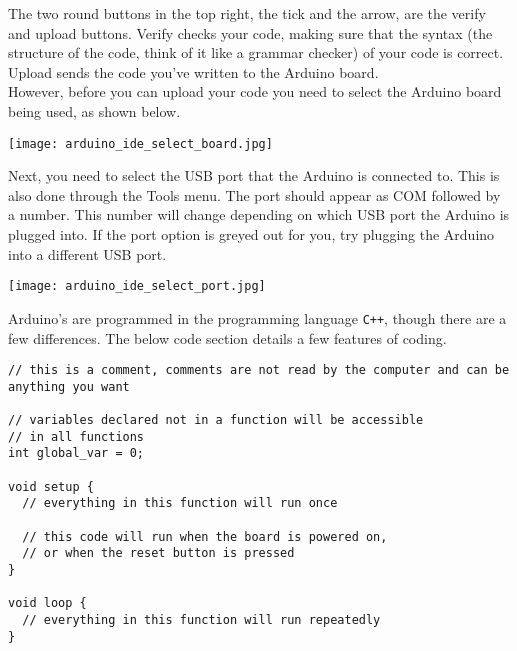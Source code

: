 \documentclass[../TinyBot.tex]{subfiles}
\begin{document}
The two round buttons in the top right, the tick and the arrow, are the verify and upload buttons. Verify checks your code, making sure that the syntax (the structure of the code, think of it like a grammar checker) of your code is correct. Upload sends the code you've written to the Arduino board.  \\

However, before you can upload your code you need to select the Arduino board being used, as shown below.

\begin{center}
  \texttt{[image: arduino\_ide\_select\_board.jpg]}
\end{center}

Next, you need to select the USB port that the Arduino is connected to. This is also done through the Tools menu. The port should appear as COM followed by a number. This number will change depending on which USB port the Arduino is plugged into. If the port option is greyed out for you, try plugging the Arduino into a different USB port. 

\begin{center}
  \texttt{[image: arduino\_ide\_select\_port.jpg]}
\end{center}

\bigskip










Arduino's are programmed in the programming language \lstinline[]!C++!, though there are a few differences. The below code section details a few features of coding.


\begin{lstlisting}
// this is a comment, comments are not read by the computer and can be anything you want

// variables declared not in a function will be accessible
// in all functions
int global_var = 0;

void setup {
  // everything in this function will run once

  // this code will run when the board is powered on,
  // or when the reset button is pressed
}

void loop {
  // everything in this function will run repeatedly
}

\end{lstlisting}
\bigskip
\end{document}
